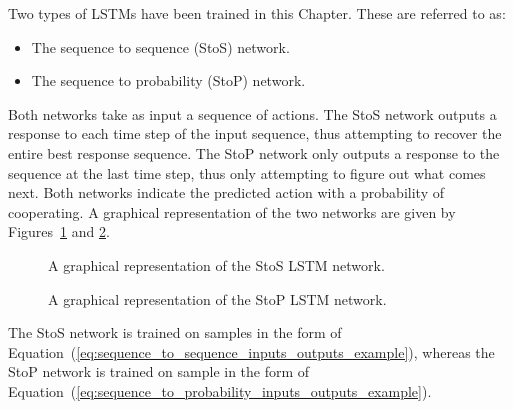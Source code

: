 Two types of LSTMs have been trained in this Chapter. These are referred to as:

\begin{itemize}
    \item The sequence to sequence (StoS) network.
    \item The sequence to probability (StoP) network.
\end{itemize}

Both networks take as input a sequence of actions. The StoS network outputs a
response to each time step of the input sequence, thus attempting to recover the entire best response sequence. The StoP network only outputs
a response to the sequence at the last time step, thus only attempting to figure out what comes next.
Both networks indicate the predicted action with a probability of cooperating.
A graphical representation of the two networks are given by
Figures~\ref{fig:sequence_to_sequence} and \ref{fig:sequence_to_probability}.

\begin{figure}[!htbp]
    \centering
    
    \caption{A graphical representation of the StoS LSTM network.}\label{fig:sequence_to_sequence}
\end{figure}

\begin{figure}[!htbp]
    \centering
    
    \caption{A graphical representation of the StoP LSTM network.}\label{fig:sequence_to_probability}
\end{figure}

The StoS network is trained on samples in the form of
Equation~(\ref{eq:sequence_to_sequence_inputs_outputs_example}), whereas the
StoP network is trained on sample in the form of
Equation~(\ref{eq:sequence_to_probability_inputs_outputs_example}).

